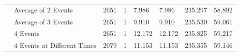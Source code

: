 \documentclass[pdflatex,sn-mathphys-num]{sn-jnl}%
\theoremstyle{thmstyleone}%
\theoremstyle{thmstyletwo}%
\theoremstyle{thmstylethree}%
\begin{document}
\begin{table}[ht]
{\begin{tabular}{@{}clllllll@{}}
                                                                                                                       & Average of 2 Events               & 2651                                                                         & 1                                                                              & 7.986                                                                          & 7.986                                                                            & 235.297                                                                                 & 58.892                                                                                   \\
                                                                                                                       & Average of 3 Events               & 2651                                                                         & 1                                                                              & 9.910                                                                          & 9.910                                                                            & 235.530                                                                                 & 59.061                                                                                   \\
                                                                                                                       & 4 Events                          & 2651                                                                         & 1                                                                              & 12.172                                                                         & 12.172                                                                           & 235.825                                                                                 & 59.217                                                                                   \\
                                                                                                                       & 4 Events at Different Times       & 2079                                                                         & 1                                                                              & 11.153                                                                         & 11.153                                                                           & 235.355                                                                                 & 59.146                                                                                   \\ \midrule

\end{tabular}}
\end{table}
\end{document}
